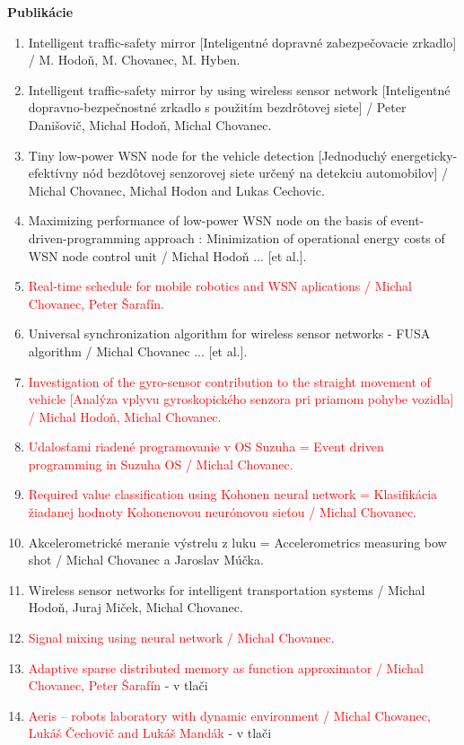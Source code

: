 \documentclass[xcolor=dvipsnames]{beamer}
\begin{document}
\begin{frame}{\bf Publikácie}
  	\tiny
\begin{enumerate}
  \item Intelligent traffic-safety mirror [Inteligentné dopravné zabezpečovacie zrkadlo] / M. Hodoň, M. Chovanec, M. Hyben.
  \item Intelligent traffic-safety mirror by using wireless sensor network [Inteligentné dopravno-bezpečnostné zrkadlo s použitím bezdrôtovej siete] / Peter Danišovič, Michal Hodoň, Michal Chovanec.
  \item Tiny low-power WSN node for the vehicle detection [Jednoduchý energeticky-efektívny nód bezdôtovej senzorovej siete určený na detekciu automobilov] / Michal Chovanec, Michal Hodon and Lukas Cechovic.
  \item Maximizing performance of low-power WSN node on the basis of event-driven-programming approach : Minimization of operational energy costs of WSN node control unit / Michal Hodoň ... [et al.].
  \item \textcolor{red}{Real-time schedule for mobile robotics and WSN aplications / Michal Chovanec, Peter Šarafín.}
  \item Universal synchronization algorithm for wireless sensor networks - FUSA algorithm / Michal Chovanec ... [et al.].
  \item \textcolor{red}{Investigation of the gyro-sensor contribution to the straight movement of vehicle [Analýza vplyvu gyroskopického senzora pri priamom pohybe vozidla] / Michal Hodoň, Michal Chovanec.}
  \item \textcolor{red}{Udalosťami riadené programovanie v OS Suzuha = Event driven programming in Suzuha OS / Michal Chovanec.}
  \item \textcolor{red}{Required value classification using Kohonen neural network = Klasifikácia žiadanej hodnoty Kohonenovou neurónovou sieťou / Michal Chovanec.}
  \item Akcelerometrické meranie výstrelu z luku = Accelerometrics measuring bow shot / Michal Chovanec a Jaroslav Múčka.
  \item Wireless sensor networks for intelligent transportation systems / Michal Hodoň, Juraj Miček, Michal Chovanec.
  \item \textcolor{red}{Signal mixing using neural network / Michal Chovanec.}
  \item \textcolor{red}{Adaptive sparse distributed memory as function approximator / Michal Chovanec, Peter Šarafín} - v tlači
  \item \textcolor{red}{Aeris – robots laboratory with dynamic environment / Michal Chovanec, Lukáš Čechovič and Lukáš Mandák} - v tlači
\end{enumerate}


\end{frame}
\end{document}
